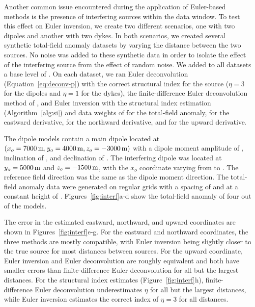 Another common issue encountered during the application of Euler-based methods
is the presence of interfering sources within the data window.
To test this effect on Euler inversion, we create two different scenarios, one
with two dipoles and another with two dykes.
In both scenarios, we created several synthetic total-field anomaly datasets
by varying the distance between the two sources.
No noise was added to these synthetic data in order to isolate the effect of
the interfering source from the effect of random noise.
We added to all datasets a base level of \SynInterfTrueBase{}.
On each dataset, we ran Euler deconvolution (Equation~\ref{eq:deconv-p}) with
the correct structural index for the source ($\eta=3$ for the dipoles and
$\eta=1$ for the dykes), the finite-difference Euler deconvolution method of
\citet{Gerovska2005}, and Euler inversion with the structural index estimation
(Algorithm~\ref{alg:si}) and data weights of \DefaultWeightsF{} for the
total-field anomaly, \DefaultWeightsE{} for the eastward derivative,
\DefaultWeightsN{} for the northward derivative, and \DefaultWeightsU{} for the
upward derivative.

The dipole models contain a main dipole located at $(x_o=\SynInterfTrueEast,
y_o=\SynInterfTrueNorth, z_o=\SynInterfTrueUp)$ with a dipole moment amplitude
of \SynInterfInt{}, inclination of \SynInterfInc, and declination of
\SynInterfDec.
The interfering dipole was located at $y_o=\SynInterfInterfNorth$ and
$z_o=\SynInterfInterfUp$, with the $x_o$ coordinate varying from
\SynInterfInterfEastMin{} to \SynInterfInterfEastMax{}.
The reference field direction was the same as the dipole moment direction.
The total-field anomaly data were generated on regular grids with a spacing of
\SynInterfSpacing{} and at a constant height of \SynInterfHeight.
Figures~\ref{fig:interf}a-d show the total-field anomaly of four out of the
\SynInterfNModels{} models.

The error in the estimated eastward, northward, and upward coordinates are
shown in Figures~\ref{fig:interf}e-g.
For the eastward and northward coordinates, the three methods are mostly
compatible, with Euler inversion being slightly closer to the true source for
most distances between sources.
For the upward coordinate, Euler inversion and Euler deconvolution are
roughly equivalent and both have smaller errors than finite-difference Euler
deconvolution for all but the largest distances.
For the structural index estimates (Figure~\ref{fig:interf}h),
finite-difference Euler deconvolution underestimates $\eta$ for all but the
largest distances, while Euler inversion estimates the correct index of
$\eta=3$ for all distances.

